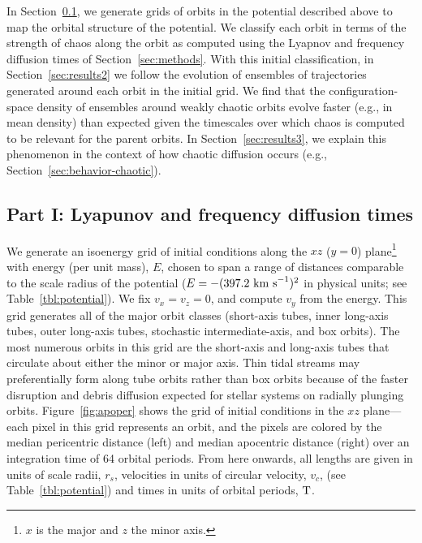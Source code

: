 \documentclass{mn2e}
\newcommand{\periods}{\ensuremath{{\rm T}}}
\begin{document}
In Section~\ref{sec:results1}, we generate grids of orbits in the potential described above to map the orbital structure of the potential. We classify each orbit in terms of the strength of chaos along the orbit as computed using the Lyapnov and frequency diffusion times of Section~\ref{sec:methods}. With this initial classification, in Section~\ref{sec:results2} we follow the evolution of ensembles of trajectories generated around each orbit in the initial grid. We find that the configuration-space density of ensembles around weakly chaotic orbits evolve faster (e.g., in mean density) than expected given the timescales over which chaos is computed to be relevant for the parent orbits. In Section~\ref{sec:results3}, we explain this phenomenon in the context of how chaotic diffusion occurs (e.g., Section~\ref{sec:behavior-chaotic}).

\subsection{Part I: Lyapunov and frequency diffusion times}\label{sec:results1}

We generate an isoenergy grid of initial conditions along the $xz$ ($y=0$) plane\footnote{$x$ is the major and $z$ the minor axis.} with energy (per unit mass), $E$, chosen to span a range of distances comparable to the scale radius of the potential ($E=-(397.2~{\rm km~s}^{-1})^2$ in physical units; see Table~\ref{tbl:potential}). We fix $v_x = v_z = 0$, and compute $v_y$ from the energy. This grid generates all of the major orbit classes (short-axis tubes, inner long-axis tubes, outer long-axis tubes, stochastic intermediate-axis, and box orbits). The most numerous orbits in this grid are the short-axis and long-axis tubes that circulate about either the minor or major axis. Thin tidal streams may preferentially form along tube orbits rather than box orbits because of the faster disruption and debris diffusion expected for stellar systems on radially plunging orbits. Figure~\ref{fig:apoper} shows the grid of initial conditions in the $xz$ plane---each pixel in this grid represents an orbit, and the pixels are colored by the median pericentric distance (left) and median apocentric distance (right) over an integration time of 64 orbital periods. From here onwards, all lengths are given in units of scale radii, $r_s$, velocities in units of circular velocity, $v_c$, (see Table~\ref{tbl:potential}) and times in units of orbital periods, $\periods$.
\end{document}
